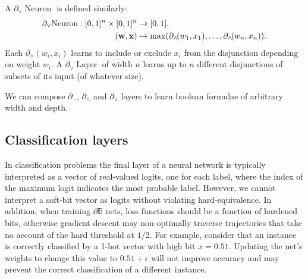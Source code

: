 \documentclass{article} %
\begin{document}
A $\partial_{\vee}\!\operatorname{Neuron}$ is defined similarly:
\begin{equation*}
\begin{aligned}
\partial_{\vee}\!\operatorname{Neuron}: [0,1]^{n} \times [0,1]^{n} &\to [0,1], \\
({\bf w}, {\bf x}) &\mapsto \max(\partial_{\wedge}\!(w_{1}, x_{1}), \dots, \partial_{\wedge}\!(w_{n}, x_{n}))\text{.}
\end{aligned}
\end{equation*}
Each $\partial_{\wedge}(w_{i},x_{i})$ learns to include or exclude $x_{i}$ from the disjunction depending on weight $w_{i}$. A $\partial_{\vee}\!\operatorname{Layer}$ of width $n$ learns up to $n$ different disjunctions of subsets of its input (of whatever size).

We can compose $\partial_{\neg}$, $\partial_{\wedge}$ and $\partial_{\vee}$ layers to learn boolean formulae of arbitrary width and depth.

\subsection{Classification layers}

In classification problems the final layer of a neural network is typically interpreted as a vector of real-valued logits, one for each label, where the index of the maximum logit indicates the most probable label. However, we cannot interpret a soft-bit vector as logits without violating hard-equivalence. In addition, when training $\partial\mathbb{B}$ nets, loss functions should be a function of hardened bits, otherwise gradient descent may non-optimally traverse trajectories that take no account of the hard threshold at $1/2$. For example, consider that an instance is correctly classified by a 1-hot vector with high bit $x=0.51$. Updating the net's weights to change this value to $0.51+\epsilon$ will not improve accuracy and may prevent the correct classification of a different instance. 
\end{document}
